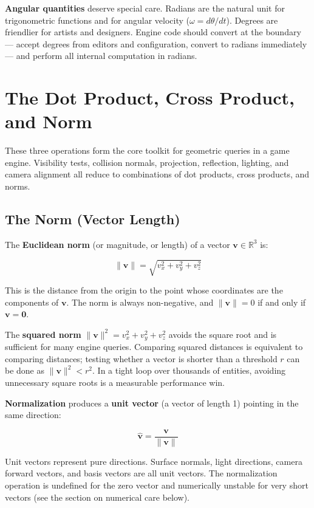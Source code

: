\documentclass[
  11pt,
  letterpaper,
  DIV=11,
  numbers=noendperiod,
  twoside,
  open=right]{scrreprt}
\begin{document}
\textbf{Angular quantities} deserve special care. Radians are the
natural unit for trigonometric functions and for angular velocity
(\(\omega = d\theta / dt\)). Degrees are friendlier for artists and
designers. Engine code should convert at the boundary --- accept degrees
from editors and configuration, convert to radians immediately --- and
perform all internal computation in radians.

\section{The Dot Product, Cross Product, and
Norm}\label{the-dot-product-cross-product-and-norm}

These three operations form the core toolkit for geometric queries in a
game engine. Visibility tests, collision normals, projection,
reflection, lighting, and camera alignment all reduce to combinations of
dot products, cross products, and norms.

\subsection{The Norm (Vector Length)}\label{the-norm-vector-length}

The \textbf{Euclidean norm} (or magnitude, or length) of a vector
\(\mathbf{v} \in \mathbb{R}^3\) is:

\[
\|\mathbf{v}\| = \sqrt{v_x^2 + v_y^2 + v_z^2}
\]

This is the distance from the origin to the point whose coordinates are
the components of \(\mathbf{v}\). The norm is always non-negative, and
\(\|\mathbf{v}\| = 0\) if and only if \(\mathbf{v} = \mathbf{0}\).

The \textbf{squared norm} \(\|\mathbf{v}\|^2 = v_x^2 + v_y^2 + v_z^2\)
avoids the square root and is sufficient for many engine queries.
Comparing squared distances is equivalent to comparing distances;
testing whether a vector is shorter than a threshold \(r\) can be done
as \(\|\mathbf{v}\|^2 < r^2\). In a tight loop over thousands of
entities, avoiding unnecessary square roots is a measurable performance
win.

\textbf{Normalization} produces a \textbf{unit vector} (a vector of
length 1) pointing in the same direction:

\[
\hat{\mathbf{v}} = \frac{\mathbf{v}}{\|\mathbf{v}\|}
\]

Unit vectors represent pure directions. Surface normals, light
directions, camera forward vectors, and basis vectors are all unit
vectors. The normalization operation is undefined for the zero vector
and numerically unstable for very short vectors (see the section on
numerical care below).
\end{document}
